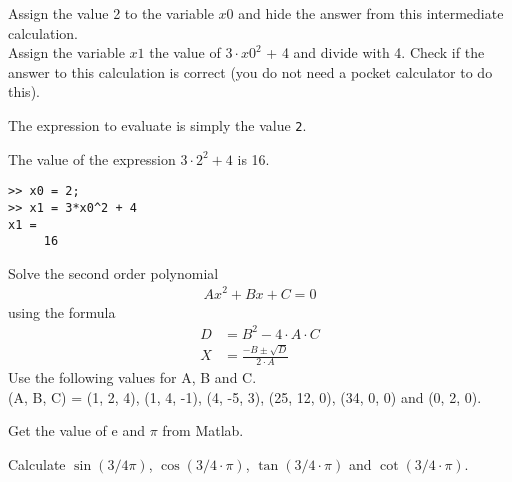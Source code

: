 \begin{ex}
Assign the value 2 to the variable $x0$ and hide the answer from this intermediate
calculation.\\
Assign the variable $x1$ the value of $3 \cdot x0^2$ + 4 and divide with 4. Check if the answer to
this calculation is correct (you do not need a pocket calculator to do this).
\begin{hint}
The expression to evaluate is simply the value \verb!2!.
\end{hint}
\begin{secondhint}
The value of the expression $3 \cdot 2^2 + 4$ is 16.
\end{secondhint}
\begin{sol}
\begin{lstlisting}
>> x0 = 2;
>> x1 = 3*x0^2 + 4
x1 = 
     16
\end{lstlisting}
\end{sol}
\end{ex}
\known{=, \^}


\begin{ex}
Solve the second order polynomial
\begin{align}
A x^2 + B x + C = 0
\end{align}
using the formula
\begin{align}
D & = B^2 - 4 \cdot A \cdot C	\\
X & = \frac{-B\pm \sqrt{D}}{2 \cdot A}
\end{align}
Use the following values for A, B and C.\\ \noindent
(A, B, C) = (1, 2, 4), (1, 4, -1), (4, -5, 3), (25, 12, 0), (34, 0, 0) and (0, 2, 0).
\end{ex}

\begin{ex}
Get the value of e and $\pi$ from Matlab.
\end{ex}

\begin{ex}
Calculate $\sin(3/4\pi)$, $\cos(3/4 \cdot \pi)$, $\tan(3/4 \cdot \pi)$ and $\cot(3/4 \cdot \pi)$.
\end{ex}


